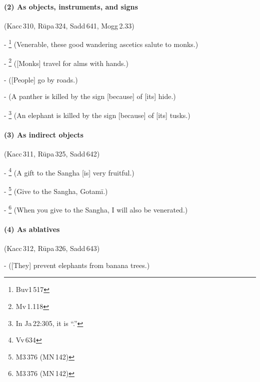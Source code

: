 \paragraph*{(2) As objects, instruments, and signs} (Kacc\,310, R\=upa\,324, Sadd\,641, Mogg\,2.33)\par
- \footnote{Buv1\,517} (Venerable, these good wandering ascetics salute to monks.)\par
- \footnote{Mv\,1.118} ([Monks] travel for alms with hands.)\par
-  ([People] go by roads.)\par
-  (A panther is killed by the sign [because] of [its] hide.)\par
- \footnote{In Ja\,22:305, it is ``.''} (An elephant is killed by the sign [because] of [its] tusks.)\par

\paragraph*{(3) As indirect objects} (Kacc\,311, R\=upa\,325, Sadd\,642)\par
- \footnote{Vv\,634} (A gift to the Sangha [is] very fruitful.)\par
- \footnote{M3\,376 (MN\,142)} (Give to the Sangha, Gotam\=i.)\par
- \footnote{M3\,376 (MN\,142)} (When you give to the Sangha, I will also be venerated.)\par

\paragraph*{(4) As ablatives} (Kacc\,312, R\=upa\,326, Sadd\,643)\par
-  ([They] prevent elephants from banana trees.)\par

